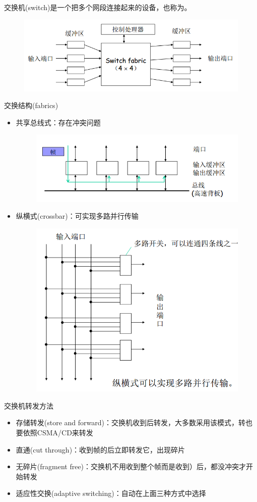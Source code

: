 \myhline
交换机(switch)是一个把多个网段连接起来的设备，也称为。
\begin{figure}[H]
	\centering
	\includegraphics[width=0.6\linewidth]{fig/switch.png}
\end{figure}

\myhline
交换结构(fabrics)
\begin{itemize}
	\item 共享总线式：存在冲突问题
	\begin{figure}[H]
		\centering
		\includegraphics[width=0.6\linewidth]{fig/switch-share.png}
	\end{figure}
	\item 纵横式(crossbar)：可实现多路并行传输
	\begin{figure}[H]
		\centering
		\includegraphics[width=0.5\linewidth]{fig/switch-crossbar.png}
	\end{figure}
\end{itemize}

\myhline
交换机转发方法
\begin{itemize}
\item 存储转发(store and forward)：交换机收到后转发，大多数采用该模式，转也要依照CSMA/CD来转发
\item 直通(cut through)：收到帧的后立即转发它，出现碎片
\item 无碎片(fragment free)：交换机不用收到整个帧而是收到）后，都没冲突才开始转发
\item 适应性交换(adaptive switching)：自动在上面三种方式中选择
\end{itemize}

